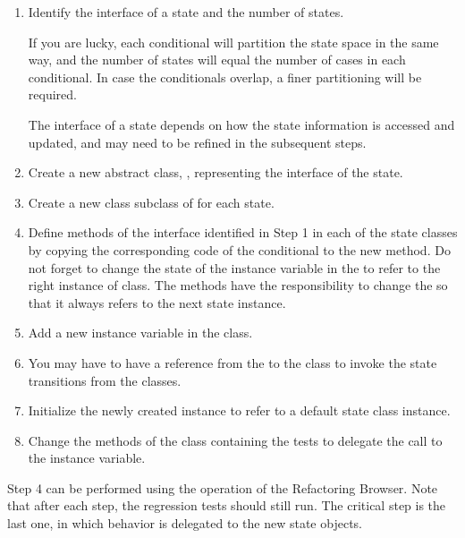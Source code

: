 \documentclass[a4paper,10pt,twoside]{book}
\begin{document}
\begin{enumerate}
  \item Identify the interface of a state and the number of states.

If you are lucky, each conditional will partition the state space in the same way, and the number of states will equal the number of cases in each conditional. In case the conditionals overlap, a finer partitioning will be required.

The interface of a state depends on how the state information is accessed and updated, and may need to be refined in the subsequent steps.

  \item Create a new abstract class, , representing the interface of the state.

  \item Create a new class subclass of  for each state.

  \item Define methods of the interface identified in Step 1 in each of the state classes by copying the corresponding code of the conditional to the new method. Do not forget to change the state of the instance variable in the  to refer to the right instance of  class. The  methods have the responsibility to change the  so that it always refers to the next state instance. 

  \item Add a new instance variable in the  class.

  \item You may have to have a reference from the  to the  class to invoke the state transitions from the  classes.

  \item Initialize the newly created instance to refer to a default state class instance.

  \item Change the methods of the  class containing the tests to delegate the call to the instance variable.
\end{enumerate}

Step 4 can be performed using the  operation of the Refactoring Browser. Note that after each step, the regression tests should still run. The critical step is the last one, in which behavior is delegated to the new state objects.
\end{document}
